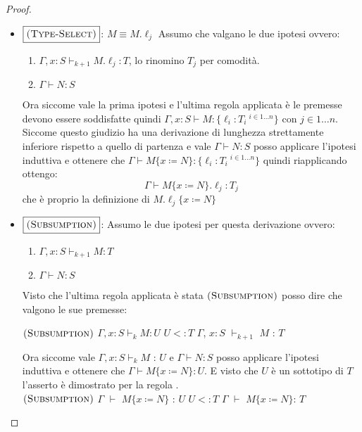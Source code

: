 \begin{proof}
\begin{itemize}
\begin{itemize}
\begin{itemize}
			\item $\boxed{\textsc{(Type-Select)}}$:
			$M \equiv M.\ell_j$
			Assumo che valgano le due ipotesi ovvero:
			\begin{enumerate}
				\item $\Gamma, x : S  \vdash_{k+1} M.\ell_j : T$, lo rinomino $T_j$ per comodit\`a.
				\item $\Gamma \vdash N : S$ 
			\end{enumerate}
			Ora siccome vale la prima ipotesi e l'ultima regola applicata \`e  le premesse devono essere soddisfatte
			quindi
			$\Gamma, x : S \vdash M : \{\ell_i : T_i\ ^{i \in 1 \dots n}\}$ con $j \in 1 \dots n$.
			Siccome questo giudizio ha una derivazione di lunghezza strettamente inferiore rispetto a quello di partenza  e vale
			$\Gamma \vdash N : S$ posso applicare l'ipotesi induttiva e ottenere che
			$\Gamma \vdash M\{x \coloneqq N \} : \{\ell_i : T_i\ ^{i \in 1 \dots n}\}$ quindi riapplicando  ottengo:
			$$
			\Gamma \vdash M\{x \coloneqq N \}.\ell_j : T_j
			$$
			che \`e proprio la definizione di $M.\ell_j \{x \coloneqq N \}$
			
			\item $\boxed{\textsc{(Subsumption)}}$: 
			Assumo le due ipotesi per questa derivazione ovvero:
			\begin{enumerate}
				\item $\Gamma, x : S \vdash_{k+1} M : T$
				\item $\Gamma \vdash N : S$
			\end{enumerate}
			Visto che l'ultima regola applicata \`e stata $\textsc{(Subsumption)}$ posso dire che valgono le sue premesse:
			
			$\textsc{(Subsumption)}$ 	$\Gamma, x : S \vdash_k M : U$ $U <: T$  $\Gamma$, $x : S$ $\vdash_{k+1}$ $M$ : $T$
		
			Ora siccome vale $\Gamma, x : S \vdash_k M$ : $U$ e $\Gamma \vdash N : S$ posso applicare l'ipotesi induttiva 
			e ottenere che $\Gamma \vdash M\{ x \coloneqq N \} : U $. 
			E visto che $U$ \`e un sottotipo di $T$ l'asserto \`e dimostrato per la regola .\\
			
			$\textsc{(Subsumption)}$ $\Gamma$ $\vdash$ $M\{x \coloneqq N \}$ : $U$  $U <: T$ $\Gamma$ $\vdash$ $M\{x \coloneqq N\}$: $T$
			
		\end{itemize}
	\end{itemize} 
\end{itemize}
	
	
\end{proof}


